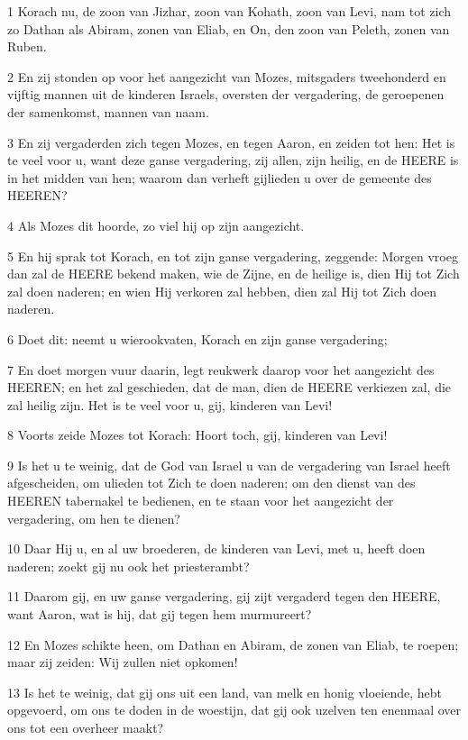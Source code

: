 \par 1 Korach nu, de zoon van Jizhar, zoon van Kohath, zoon van Levi, nam tot zich zo Dathan als Abiram, zonen van Eliab, en On, den zoon van Peleth, zonen van Ruben.
\par 2 En zij stonden op voor het aangezicht van Mozes, mitsgaders tweehonderd en vijftig mannen uit de kinderen Israels, oversten der vergadering, de geroepenen der samenkomst, mannen van naam.
\par 3 En zij vergaderden zich tegen Mozes, en tegen Aaron, en zeiden tot hen: Het is te veel voor u, want deze ganse vergadering, zij allen, zijn heilig, en de HEERE is in het midden van hen; waarom dan verheft gijlieden u over de gemeente des HEEREN?
\par 4 Als Mozes dit hoorde, zo viel hij op zijn aangezicht.
\par 5 En hij sprak tot Korach, en tot zijn ganse vergadering, zeggende: Morgen vroeg dan zal de HEERE bekend maken, wie de Zijne, en de heilige is, dien Hij tot Zich zal doen naderen; en wien Hij verkoren zal hebben, dien zal Hij tot Zich doen naderen.
\par 6 Doet dit: neemt u wierookvaten, Korach en zijn ganse vergadering;
\par 7 En doet morgen vuur daarin, legt reukwerk daarop voor het aangezicht des HEEREN; en het zal geschieden, dat de man, dien de HEERE verkiezen zal, die zal heilig zijn. Het is te veel voor u, gij, kinderen van Levi!
\par 8 Voorts zeide Mozes tot Korach: Hoort toch, gij, kinderen van Levi!
\par 9 Is het u te weinig, dat de God van Israel u van de vergadering van Israel heeft afgescheiden, om ulieden tot Zich te doen naderen; om den dienst van des HEEREN tabernakel te bedienen, en te staan voor het aangezicht der vergadering, om hen te dienen?
\par 10 Daar Hij u, en al uw broederen, de kinderen van Levi, met u, heeft doen naderen; zoekt gij nu ook het priesterambt?
\par 11 Daarom gij, en uw ganse vergadering, gij zijt vergaderd tegen den HEERE, want Aaron, wat is hij, dat gij tegen hem murmureert?
\par 12 En Mozes schikte heen, om Dathan en Abiram, de zonen van Eliab, te roepen; maar zij zeiden: Wij zullen niet opkomen!
\par 13 Is het te weinig, dat gij ons uit een land, van melk en honig vloeiende, hebt opgevoerd, om ons te doden in de woestijn, dat gij ook uzelven ten enenmaal over ons tot een overheer maakt?
